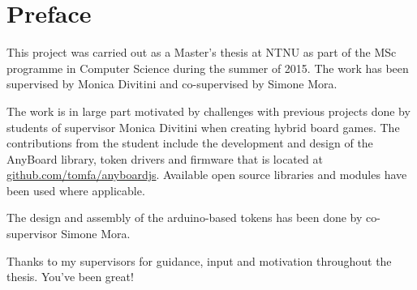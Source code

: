 \chapter{Preface}
This project was carried out as a Master’s thesis at NTNU as part of the MSc programme in Computer Science during the summer of 2015. The work has been supervised by Monica Divitini and co-supervised by Simone Mora.

The work is in large part motivated by challenges with previous projects done by students of supervisor Monica Divitini when creating hybrid board games. The contributions from the student include the development and design of the AnyBoard library, token drivers and firmware that is located at \href{https://github.com/tomfa/anyboardjs/}{github.com/tomfa/anyboardjs}. Available open source libraries and modules have been used where applicable.

The design and assembly of the arduino-based tokens has been done by co-supervisor Simone Mora.

Thanks to my supervisors for guidance, input and motivation throughout the thesis. You've been great!

\newpage
